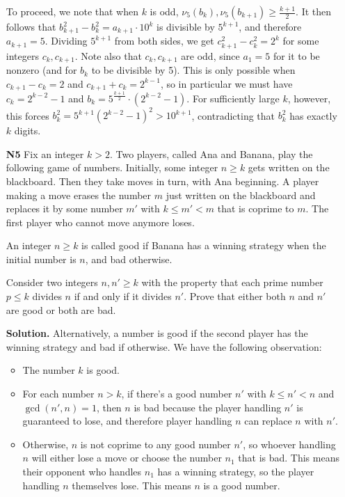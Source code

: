 \documentclass[11pt,a4paper]{article}
\begin{document}
\begin{enumerate}
    To proceed, we note that when $k$ is odd, $\nu_5(b_k), \nu_5(b_{k+1})\ge \frac{k+1}{2}$. 
    It then follows that $b_{k+1}^2-b_k^2 = a_{k+1}\cdot 10^k$ is divisible by $5^{k+1}$, 
    and therefore $a_{k+1}=5$.  Dividing $5^{k+1}$ from both sides, 
    we get $c_{k+1}^2 - c_k^2 = 2^k$ for some integers $c_{k}, c_{k+1}$. 
    Note also that $c_k, c_{k+1}$ are odd, since $a_1=5$ for it to be nonzero (and for $b_k$ to be divisible by 5). 
    This is only possible when $c_{k+1}-c_k=2$ and $c_{k+1}+c_k = 2^{k-1}$, 
    so in particular we must have $c_k = 2^{k-2} - 1$ and $b_k = 5^{\frac{k+1}{2}}\cdot (2^{k-2} - 1)$. 
    For sufficiently large $k$, however, this forces $b_k^2 = 5^{k+1}(2^{k-2}-1)^2 > 10^{k+1}$, 
    contradicting that $b_k^2$ has exactly $k$ digits. 
	
	\item[\textbf{N5}] Fix an integer $k>2$. Two players, called Ana and Banana, play the following game of numbers. Initially, some integer $n \ge k$ gets written on the blackboard. Then they take moves in turn, with Ana beginning. A player making a move erases the number $m$ just written on the blackboard and replaces it by some number $m'$ with $k \le m' < m$ that is coprime to $m$. The first player who cannot move anymore loses.
	
	An integer $n \ge k $ is called good if Banana has a winning strategy when the initial number is $n$, and bad otherwise.
	
	Consider two integers $n,n' \ge k$ with the property that each prime number $p \le k$ divides $n$ if and only if it divides $n'$. Prove that either both $n$ and $n'$ are good or both are bad.
	
	\textbf{Solution.} Alternatively, a number is good if the second player has the winning strategy and bad if otherwise. We have the following observation: 
	
	\begin{itemize} 
		\item The number $k$ is good. 
		
		\item For each number $n>k$, if there's a good number $n'$ with $k\le n'<n$ and $\gcd(n', n)=1$, then $n$ is bad because the player handling $n'$ is guaranteed to lose, and therefore player handling $n$ can replace $n$ with $n'$. 
		
		\item Otherwise, $n$ is not coprime to any good number $n'$, so whoever handling $n$ will either lose a move or choose the number $n_1$ that is bad. This means their opponent who handles $n_1$ has a winning strategy, so the player handling $n$ themselves lose. This means $n$ is a good number. 
		

\end{itemize}
\end{enumerate}
\end{document}
